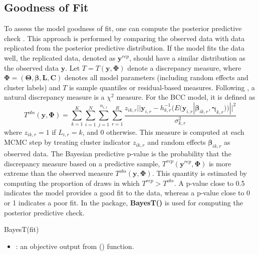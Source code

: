 \subsection{Goodness of Fit}
To assess the model goodness of fit, one can compute the posterior predictive check \citep{Gelman1996}. This approach is performed by comparing the observed data with data replicated from the posterior predictive distribution. If the model fits the data well, the replicated data, denoted as $\boldsymbol{y}^{rep}$, should have a similar distribution as the observed data $\boldsymbol{y}$. Let $T = T(\boldsymbol{y},\boldsymbol{\Phi})$ denote a discrepancy measure, where $\boldsymbol{\Phi} = (\boldsymbol{\Theta}, \boldsymbol{\beta}, \boldsymbol{L}, \boldsymbol{C})$ denotes all model parameters (including random effects and cluster labels) and $T$ is sample quantiles or residual-based measures. Following \citet{Gelman1996}, a natural discrepancy measure is a $\chi^2$ measure. For the BCC model, it is defined as 
\begin{equation}
T^{obs}(\boldsymbol{y},\boldsymbol{\Phi})= \sum^K_{k=1} \sum_{i=1}^N \sum_{j=1}^{n_{i,r}}   \sum_{r=1}^R \frac{ z_{ik,r} ||\boldsymbol{y}_{i,r} - h^{-1}_{k,r}(E(\boldsymbol{y}_{i,r}|\boldsymbol{\beta}_{ik,r},\boldsymbol{\gamma}_{k,r}))||^2}{\sigma_{k,r}^2} 
\end{equation}
where $z_{ik,r} = 1$ if $L_{i,r}=k$, and 0 otherwise. This measure is computed at each MCMC step by treating cluster indicator $z_{ik,r}$ and random effects $\boldsymbol{\beta}_{ik,r}$ as observed data.
The Bayesian predictive p-value is the probability that the discrepancy measure based on a predictive sample, $ T^{rep}(\boldsymbol{y}^{rep},\boldsymbol{\Phi})$ is more extreme than the observed measure $T^{obs}(\boldsymbol{y},\boldsymbol{\Phi})$. This quantity is estimated by computing the proportion of draws in which $T^{rep} > T^{obs}$. A p-value close to 0.5 indicates the model provides a good fit to the data, whereas a p-value close to 0 or 1 indicates a poor fit.
In the  package, \textbf{BayesT()} is used for computing the posterior predictive check. 
\begin{example}
BayesT(fit)
\end{example}
\begin{itemize}
	\item {}: an objective output from () function.  
\end{itemize}
